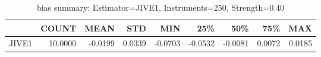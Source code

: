 \begin{table}[ht]
\centering
\caption{bias summary: Estimator=JIVE1, Instruments=250, Strength=0.40}
\begin{tabular}{lrrrrrrrr}
\toprule
 & COUNT & MEAN & STD & MIN & 25\% & 50\% & 75\% & MAX \\
\midrule
JIVE1 & 10.0000 & -0.0199 & 0.0339 & -0.0703 & -0.0532 & -0.0081 & 0.0072 & 0.0185 \\
\bottomrule
\end{tabular}
\end{table}
